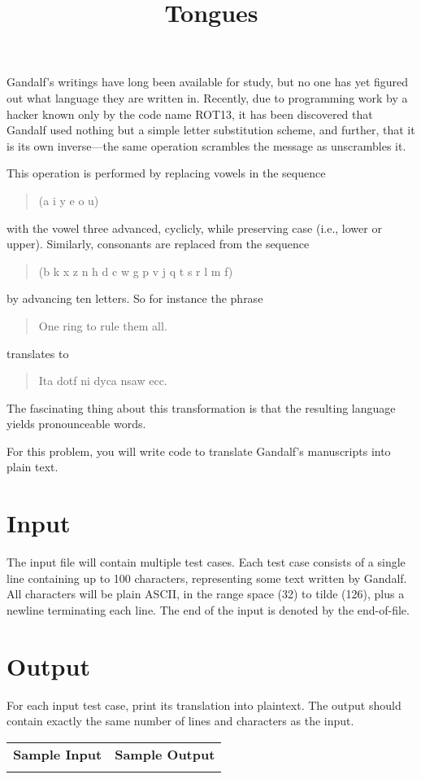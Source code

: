 \documentclass{article}
\title{Tongues}
\date{}
\begin{document}
\maketitle

Gandalf's writings have long been available for study, but no one
has yet figured out what language they are written in.  Recently,
due to programming work by a hacker known only by the code name
ROT13, it has been discovered that Gandalf used nothing but a
simple letter substitution scheme, and further, that it is its
own inverse---the same operation scrambles the message as
unscrambles it.

This operation is performed by replacing vowels in the sequence
\begin{quote}
(a i y e o u)
\end{quote}
with the vowel three advanced, cyclicly, while preserving case (i.e., lower or
upper).  Similarly, consonants
are replaced from the sequence
\begin{quote}
(b k x z n h d c w g p v j q t s r l m f)
\end{quote}
by advancing ten letters.  So for instance the phrase
\begin{quote}
   One ring to rule them all.
\end{quote}
translates to
\begin{quote}
   Ita dotf ni dyca nsaw ecc.
\end{quote}
The fascinating thing about this transformation is that the resulting
language yields pronounceable words.

For this problem, you will write code to translate Gandalf's
manuscripts into plain text.

\section{Input}

The input file will contain multiple test cases.  Each test case consists of a
single line containing up to 100 characters, representing some text written
by Gandalf.  All characters will be plain ASCII, in the range space (32)
to tilde (126), plus a newline terminating each line.
The end of the input is denoted by the end-of-file.

\section{Output}

For each input test case, print its translation into plaintext.
The output should contain exactly the same number of
lines and characters as the input.

\vskip 16pt
\noindent
\setlength{\extrarowheight}{4pt}
\begin{tabularx}{\textwidth}{ | X | X | }
\hline
\textbf{Sample Input} & \textbf{Sample Output} \\

&

\\
\hline
\end{tabularx}
\end{document}
